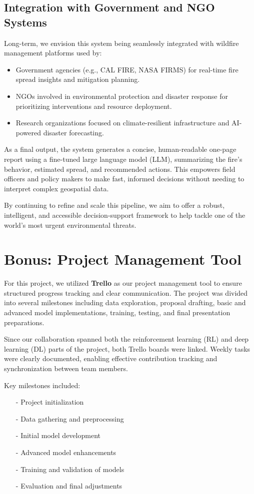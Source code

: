 \documentclass[conference]{IEEEtran}
\begin{document}
\subsection{Integration with Government and NGO Systems}
Long-term, we envision this system being seamlessly integrated with wildfire management platforms used by:

\begin{itemize}
    \item Government agencies (e.g., CAL FIRE, NASA FIRMS) for real-time fire spread insights and mitigation planning.
    \item NGOs involved in environmental protection and disaster response for prioritizing interventions and resource deployment.
    \item Research organizations focused on climate-resilient infrastructure and AI-powered disaster forecasting.
\end{itemize}

\noindent
As a final output, the system generates a concise, human-readable one-page report using a fine-tuned large language model (LLM), summarizing the fire’s behavior, estimated spread, and recommended actions. This empowers field officers and policy makers to make fast, informed decisions without needing to interpret complex geospatial data.

\noindent
By continuing to refine and scale this pipeline, we aim to offer a robust, intelligent, and accessible decision-support framework to help tackle one of the world’s most urgent environmental threats.

\section{Bonus: Project Management Tool}
For this project, we utilized \textbf{Trello} as our project management tool to ensure structured progress tracking and clear communication. The project was divided into several milestones including data exploration, proposal drafting, basic and advanced model implementations, training, testing, and final presentation preparations.

Since our collaboration spanned both the reinforcement learning (RL) and deep learning (DL) parts of the project, both Trello boards were linked. Weekly tasks were clearly documented, enabling effective contribution tracking and synchronization between team members.

Key milestones included:

\begin{enumerate}
    \item[-] Project initialization
    \item[-] Data gathering and preprocessing
    \item[-] Initial model development
    \item[-] Advanced model enhancements
    \item[-] Training and validation of models
    \item[-] Evaluation and final adjustments
\end{enumerate}
\end{document}
